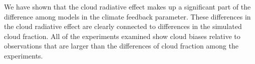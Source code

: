 \documentclass[draft]{agujournal2019}
\begin{document}
We have shown that the cloud radiative effect makes up a significant part of the difference 
among models in the climate feedback parameter.  These differences in the cloud radiative
effect are clearly connected to differences in the simulated cloud fraction.  
All of the experiments examined show cloud biases relative to observations that are larger than the differences of cloud fraction among the experiments.      

\end{document}
